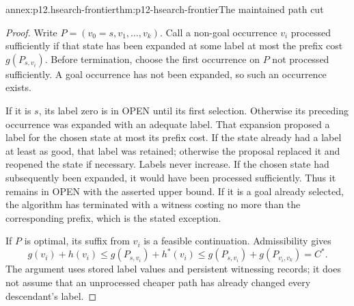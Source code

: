\begin{annexitem}{annex:p12.hsearch-frontier}{thm:p12-hsearch-frontier}{The maintained path cut}
\begin{proof}
Write \(P=(v_0=s,v_1,\ldots,v_k)\). Call a non-goal occurrence
\(v_i\) processed sufficiently if that state has been expanded at some
label at most the prefix cost \(g(P_{s,v_i})\). Before termination,
choose the first occurrence on \(P\) not processed sufficiently.
A goal occurrence has not been expanded, so such an occurrence exists.

If it is \(s\), its label zero is in OPEN until its first selection.
Otherwise its preceding occurrence was expanded with an adequate label.
That expansion proposed a label for the chosen state at most its prefix
cost. If the state already had a label at least as good, that label was
retained; otherwise the proposal replaced it and reopened the state if
necessary. Labels never increase. If the chosen state had subsequently
been expanded, it would have been processed sufficiently. Thus it remains
in OPEN with the asserted upper bound. If it is a goal already selected,
the algorithm has terminated with a witness costing no more than the
corresponding prefix, which is the stated exception.

If \(P\) is optimal, its suffix from \(v_i\) is a feasible
continuation. Admissibility gives
\[
 g(v_i)+h(v_i)\le g(P_{s,v_i})+h^*(v_i)
 \le g(P_{s,v_i})+g(P_{v_i,v_k})=C^*.
\]
The argument uses stored label values and persistent witnessing records;
it does not assume that an unprocessed cheaper path has already changed
every descendant's label.
\end{proof}
\end{annexitem}

